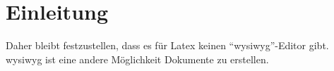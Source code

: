 \section{Einleitung}\label{sec:einleitung}
\blindtext
Daher bleibt festzustellen,
dass es für Latex keinen \enquote{\ac{wysiwyg}}-Editor gibt.
\ac{wysiwyg} ist eine andere Möglichkeit Dokumente zu erstellen.